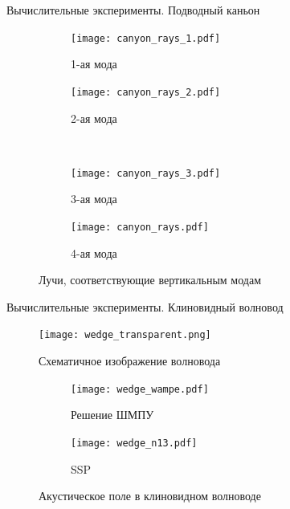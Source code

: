 \documentclass[12pt, unicode]{beamer}
\begin{document}
	\begin{frame}{Вычислительные эксперименты. Подводный каньон}
		\begin{figure}[h]
			\centering
            \begin{subfigure}{0.45\textwidth}
                \centering
                \texttt{[image: canyon\_rays\_1.pdf]}
                \caption{1-ая мода}
            \end{subfigure}
            \begin{subfigure}{0.45\textwidth}
                \centering
                \texttt{[image: canyon\_rays\_2.pdf]}
                \caption{2-ая мода}
            \end{subfigure}\\
            \begin{subfigure}{0.45\textwidth}
                \centering
                \texttt{[image: canyon\_rays\_3.pdf]}
                \caption{3-ая мода}
            \end{subfigure}
            \begin{subfigure}{0.45\textwidth}
                \centering
                \texttt{[image: canyon\_rays.pdf]}
                \caption{4-ая мода}
            \end{subfigure}
			\caption{Лучи, соответствующие вертикальным модам}
		\end{figure}
	\end{frame}

    
    \begin{frame}[fragile]{Вычислительные эксперименты. Клиновидный волновод}
        \vspace{-0.25cm}
        \begin{figure}[h]
            \centering
            \texttt{[image: wedge\_transparent.png]}
            \caption{Схематичное изображение волновода}
        \end{figure}
        \vspace{-0.75cm}
        \begin{figure}[h]
            \centering
            \begin{subfigure}[t]{0.35\textwidth}
                \centering
                \texttt{[image: wedge\_wampe.pdf]}
                \caption{Решение ШМПУ}
            \end{subfigure}
            \begin{subfigure}[t]{0.35\textwidth}
                \centering
                \texttt{[image: wedge\_n13.pdf]}
                \caption{SSP}
            \end{subfigure}
            \caption{Акустическое поле в клиновидном волноводе}
        \end{figure}
    \end{frame}
\end{document}

